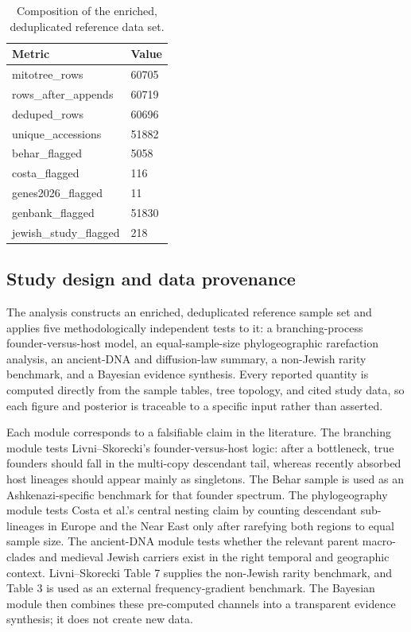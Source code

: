 \documentclass[11pt]{article}
\begin{document}
\begin{table}[htbp]
\centering
\small
\caption{Composition of the enriched, deduplicated reference data set.}
\label{tab:data}
\begin{tabular}{ll}
\toprule
Metric & Value \\
\midrule
mitotree\_rows & 60705 \\
rows\_after\_appends & 60719 \\
deduped\_rows & 60696 \\
unique\_accessions & 51882 \\
behar\_flagged &  5058 \\
costa\_flagged &   116 \\
genes2026\_flagged &    11 \\
genbank\_flagged & 51830 \\
jewish\_study\_flagged &   218 \\
\bottomrule
\end{tabular}
\end{table}
\subsection{Study design and data provenance}
The analysis constructs an enriched, deduplicated reference sample set and applies five methodologically independent tests to it: a branching-process founder-versus-host model, an equal-sample-size phylogeographic rarefaction analysis, an ancient-DNA and diffusion-law summary, a non-Jewish rarity benchmark, and a Bayesian evidence synthesis. Every reported quantity is computed directly from the sample tables, tree topology, and cited study data, so each figure and posterior is traceable to a specific input rather than asserted.

Each module corresponds to a falsifiable claim in the literature. The branching module tests Livni--Skorecki's founder-versus-host logic: after a bottleneck, true founders should fall in the multi-copy descendant tail, whereas recently absorbed host lineages should appear mainly as singletons. The Behar sample is used as an Ashkenazi-specific benchmark for that founder spectrum. The phylogeography module tests Costa et al.'s central nesting claim by counting descendant sub-lineages in Europe and the Near East only after rarefying both regions to equal sample size. The ancient-DNA module tests whether the relevant parent macro-clades and medieval Jewish carriers exist in the right temporal and geographic context. Livni--Skorecki Table 7 supplies the non-Jewish rarity benchmark, and Table 3 is used as an external frequency-gradient benchmark. The Bayesian module then combines these pre-computed channels into a transparent evidence synthesis; it does not create new data.
\end{document}
